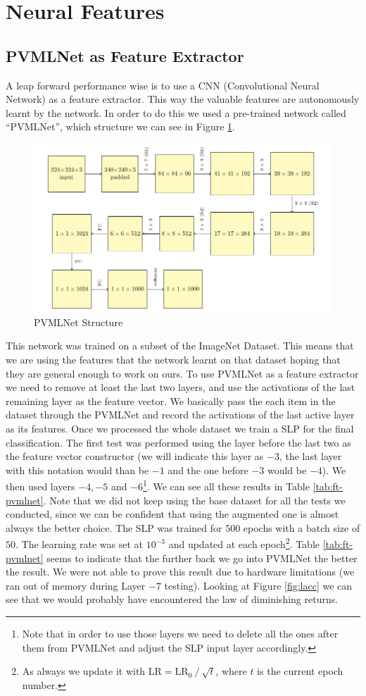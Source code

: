 \documentclass[10pt,a4paper]{report}
\begin{document}
\section{Neural Features} 
\subsection{PVMLNet as Feature Extractor}
A leap forward performance wise is to use a CNN (Convolutional Neural Network) as a feature extractor. This way the valuable features are autonomously learnt by the network. In order to do this we used a pre-trained network called \enquote{PVMLNet}, which structure we can see in Figure \ref{fig:pvmlnetstruct}.
\begin{figure}[!ht]
\centering
\includegraphics[width=0.75\linewidth]{pvmlnet.png}
\caption{PVMLNet Structure}
\label{fig:pvmlnetstruct}
\end{figure}
This network was trained on a subset of the ImageNet Dataset. This means that we are using the features that the network learnt on that dataset hoping that they are general enough to work on ours. To use PVMLNet as a feature extractor we need to remove at least the last two layers, and use the activations of the last remaining layer as the feature vector. We basically pass the each item in the dataset through the PVMLNet and record the activations of the last active layer as its features. Once we processed the whole dataset we train a SLP for the final classification. The first test was performed using the layer before the last two as the feature vector constructor (we will indicate this layer as $-3$, the last layer with this notation would than be $-1$ and the one before $-3$ would be $-4$). We then used layers $-4, -5$ and $-6$\footnote{Note that in order to use those layers we need to delete all the ones after them from PVMLNet and adjust the SLP input layer accordingly.}. We can see all these results in Table \ref{tab:ft-pvmlnet}. Note that we did not keep using the base dataset for all the tests we conducted, since we can be confident that using the augmented one is almost always the better choice. The SLP was trained for $500$ epochs with a batch size of $50$. The learning rate was set at $10^{-3}$ and updated at each epoch\footnote{As always we update it with $\text{LR}=\text{LR}_0 \mathbin{/} \sqrt{t}$, where $t$ is the current epoch number.}. Table \ref{tab:ft-pvmlnet} seems to indicate that the further back we go into PVMLNet the better the result. We were not able to prove this result due to hardware limitations (we ran out of memory during Layer $-7$ testing). Looking at Figure \ref{fig:lacc} we can see that we would probably have encountered the law of diminishing returns.
\end{document}

